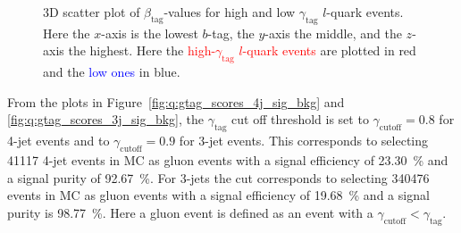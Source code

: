 \begin{figure}[h!]
  \centering
  \vspace{2mm}
  \caption[3D Scatter Plot of $\beta_\mathrm{tag}$-Values for High and Low $\gamma_\mathrm{tag}$ $l$-Quark Events]{
    3D scatter plot of $\beta_\mathrm{tag}$-values for high and low $\gamma_\mathrm{tag}$ $l$-quark events. Here the $x$-axis is the lowest $b$-tag, the $y$-axis
  the middle, and the $z$-axis the highest. Here the \textcolor{red}{high-$\gamma_\mathrm{tag}$ $l$-quark events} are plotted in red and the \textcolor{blue}{low ones} in blue.}
  \label{fig:q:gtag_scores_3j_l_quarks_3d}%
\end{figure}

From the plots in Figure~\ref{fig:q:gtag_scores_4j_sig_bkg} and \ref{fig:q:gtag_scores_3j_sig_bkg}, the $\gamma_\mathrm{tag}$ cut off threshold is set to $\gamma_\mathrm{cutoff} = 0.8$ for 4-jet events and to $\gamma_\mathrm{cutoff} = 0.9$ for 3-jet events. This corresponds to selecting \num{41117} 4-jet events in MC as gluon events with a signal efficiency of \SI{23.30}{\percent} and a signal purity of \SI{92.67}{\percent}. For 3-jets the cut corresponds to selecting \num{340476} events in MC as gluon events with a signal efficiency of \SI{19.68}{\percent} and a signal purity is \SI{98.77}{\percent}. Here a gluon event is defined as an event with a $\gamma_\mathrm{cutoff} < \gamma_\mathrm{tag}$.


